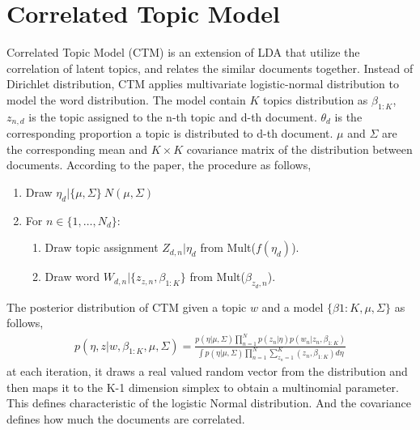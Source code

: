 \section{Correlated Topic Model}
Correlated Topic Model (CTM)\cite{blei_correlated_2007} is an extension of LDA that utilize the correlation of latent topics, and relates the similar documents together. Instead of Dirichlet distribution, CTM applies multivariate logistic-normal distribution to model the word distribution. 
The model contain $ K $ topics distribution as $ \beta_{1:K} $, 
$ z_{n,d} $ is the topic assigned to the n-th topic and d-th document.
$ \theta_d $ is the corresponding proportion a topic is distributed to d-th document.
$ \mu $ and $ \Sigma $ are the corresponding mean and $ K \times K $ covariance matrix of the distribution between documents.
According to the paper\cite{blei_correlated_2007}, the procedure as follows,
\begin{enumerate}
\item Draw $\eta_d|\{\mu,\Sigma\}~N(\mu,\Sigma)$
\item For $ n \in \{1,\dots,N_d\} $:
\begin{enumerate}
\item Draw topic assignment $ Z_{d,n}|\eta_d $ from Mult($ f(\eta_d) $).
\item Draw word $ W_{d,n}|\{z_{z,n},\beta_{1:K}\} $ from Mult($ \beta_{z_d,n} $).
\end{enumerate}
\end{enumerate}
The posterior distribution of CTM given a topic $ w $ and a model $\{\beta{1:K},\mu,\Sigma\}$ as follows,
\begin{equation*}
\begin{array}{l}
p(\eta,z|w,\beta_{1:K},\mu,\Sigma)
=\frac{p(\eta|\mu,\Sigma)\prod_{n=1}^{N}p(z_n|\eta)p(w_n|z_n,\beta_{1:K})}{\int p(\eta|\mu,\Sigma)\prod_{n=1}^{N}\sum_{z_n=1}^{K}(z_n,\beta_{1:K})d\eta}
\end{array}
\end{equation*}
at each iteration, it draws a real valued random vector from the distribution and then maps it to the K-1 dimension simplex to obtain a multinomial parameter. This defines characteristic of the logistic Normal distribution. And the covariance defines how much the documents are correlated. 
